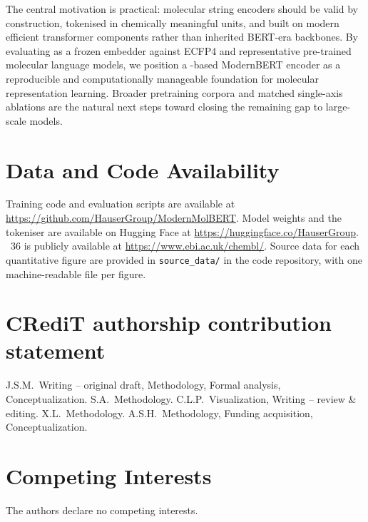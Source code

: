 \documentclass[11pt,a4paper]{article}
\begin{document}
The central motivation is practical: molecular string encoders should be
valid by construction, tokenised in chemically meaningful units, and built on
modern efficient transformer components rather than inherited BERT-era
backbones. By evaluating \model{} as a frozen embedder against ECFP4 and
representative pre-trained molecular language models, we position
a \selfies{}-based ModernBERT encoder as a reproducible and computationally
manageable foundation for molecular representation learning. Broader pretraining
corpora and matched single-axis ablations are the natural next steps toward
closing the remaining gap to large-scale models.


\section*{Data and Code Availability}

Training code and evaluation scripts are available at
\url{https://github.com/HauserGroup/ModernMolBERT}.
Model weights and the \ape{} tokeniser are available on Hugging Face
at \url{https://huggingface.co/HauserGroup}.
\chembl{}~36 is publicly available at
\url{https://www.ebi.ac.uk/chembl/}.
Source data for each quantitative figure are provided in \texttt{source\_data/}
in the code repository, with one machine-readable file per figure.

\section*{CRediT authorship contribution statement}

J.S.M.\ Writing – original draft, Methodology, Formal
analysis, Conceptualization.
S.A.\ Methodology.
C.L.P.\ Visualization, Writing – review \& editing.
X.L.\ Methodology.
A.S.H.\ Methodology, Funding
acquisition, Conceptualization.

\section*{Competing Interests}

The authors declare no competing interests.
\end{document}
